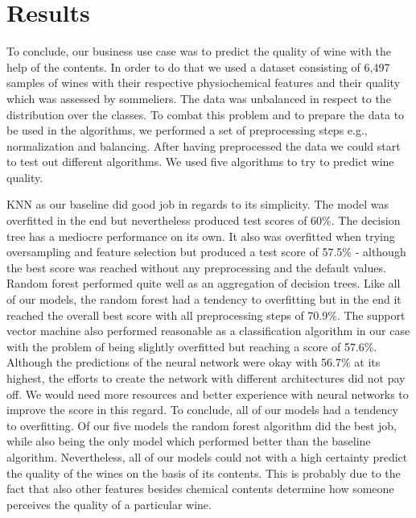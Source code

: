 \chapter{Results}
To conclude, our business use case was to predict the quality of wine with the help of the contents. In order to do that we used a dataset consisting of 6,497 samples of wines with their respective physiochemical features and their quality which was assessed by sommeliers. The data was unbalanced in respect to the distribution over the classes. To combat this problem and to prepare the data to be used in the algorithms, we performed a set of preprocessing steps e.g., normalization and balancing. After having preprocessed the data we could start to test out different algorithms. We used five algorithms to try to predict wine quality. 

KNN as our baseline did good job in regards to its simplicity. The model was overfitted in the end but nevertheless produced test scores of 60\%. The decision tree has a mediocre performance on its own. It also was overfitted when trying oversampling and feature selection but produced a test score of 57.5\% - although the best score was reached without any preprocessing and the default values. Random forest performed quite well as an aggregation of decision trees. Like all of our models, the random forest had a tendency to overfitting but in the end it reached the overall best score with all preprocessing steps of 70.9\%. The support vector machine also performed reasonable as a classification algorithm in our case with the problem of being slightly overfitted but reaching a score of 57.6\%.
Although the predictions of the neural network were okay with 56.7\% at its highest, the efforts to create the network with different architectures did not pay off. We would need more resources and better experience with neural networks to improve the score in this regard. To conclude, all of our models had a tendency to overfitting.
Of our five models the random forest algorithm did the best job, while also being the only model which performed better than the baseline algorithm.
Nevertheless, all of our models could not with a high certainty predict the quality of the wines on the basis of its contents. This is probably due to the fact that also other features besides chemical contents determine how someone perceives the quality of a particular wine.